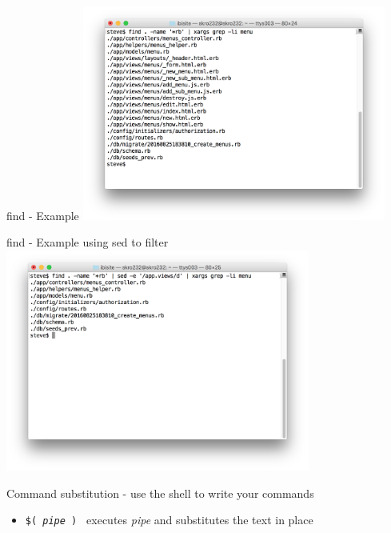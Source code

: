\documentclass[t]{beamer}
\begin{document}
\begin{frame}{find - Example}
  \includegraphics[width=10cm,scale=0.4]{images/find.png}
  \note{}
\end{frame}

\begin{frame}{find - Example using sed to filter}
  \includegraphics[width=10cm,scale=0.4]{images/find-1.png}
  \note{}
\end{frame}

\begin{frame}{Command substitution - use the shell to write your commands}
  \begin{itemize}
  \item \texttt{\$( \textit{pipe} ) } executes \textit{pipe} and
    substitutes the text in place
  \end{itemize}
  \note{}
\end{frame}
\end{document}
